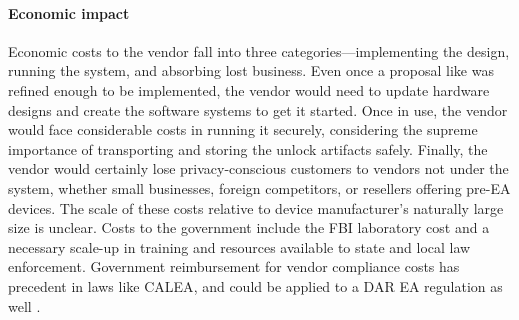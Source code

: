 \paragraph*{Economic impact} Economic costs to the vendor fall into three categories---implementing the design, running
the system, and absorbing lost business. Even once a proposal like \ldawmsr was refined enough to be implemented, the
vendor would need to update hardware designs and create the software systems to get it started. Once in use, the vendor
would face considerable costs in running it securely, considering the supreme importance of transporting and storing the
unlock artifacts safely. Finally, the vendor would certainly lose privacy-conscious customers to vendors not under the
system, whether small businesses, foreign competitors, or resellers offering pre-\ac{EA} devices. The scale of these
costs relative to device manufacturer's naturally large size is unclear. Costs to the government include the \ac{FBI}
laboratory cost and a necessary scale-up in training and resources available to state and local law enforcement.
Government reimbursement for vendor compliance costs has precedent in laws like \acs{CALEA}, and could be applied to a
\ac{DAR} \ac{EA} regulation as well \cite{edwards_hr4922_1994}.
